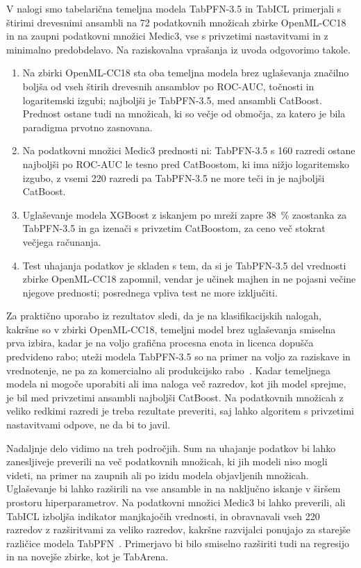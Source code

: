 \documentclass[a4paper,12pt,openright]{book}
\begin{document}
V nalogi smo tabelarična temeljna modela TabPFN-3.5 in TabICL primerjali s
štirimi drevesnimi ansambli na 72 podatkovnih množicah zbirke OpenML-CC18 in na
zaupni podatkovni množici Medic3, vse s privzetimi nastavitvami in z minimalno
predobdelavo. Na raziskovalna vprašanja iz uvoda odgovorimo takole.
\begin{enumerate}
\item Na zbirki OpenML-CC18 sta oba temeljna modela brez uglaševanja značilno
boljša od vseh štirih drevesnih ansamblov po ROC-AUC, točnosti in logaritemski
izgubi; najboljši je TabPFN-3.5, med ansambli CatBoost. Prednost ostane tudi na
množicah, ki so večje od območja, za katero je bila paradigma prvotno
zasnovana.
\item Na podatkovni množici Medic3 prednosti ni: TabPFN-3.5 s 160 razredi ostane
najboljši po ROC-AUC le tesno pred CatBoostom, ki ima nižjo logaritemsko
izgubo, z vsemi 220 razredi pa TabPFN-3.5 ne more teči in je najboljši CatBoost.
\item Uglaševanje modela XGBoost z iskanjem po mreži zapre \SI{38}{\percent}
zaostanka za TabPFN-3.5 in ga izenači s privzetim CatBoostom, za ceno več
stokrat večjega računanja.
\item Test uhajanja podatkov je skladen s tem, da si je TabPFN-3.5 del
vrednosti zbirke OpenML-CC18 zapomnil, vendar je učinek majhen in ne pojasni
večine njegove prednosti; posrednega vpliva test ne more izključiti.
\end{enumerate}

Za praktično uporabo iz rezultatov sledi, da je na klasifikacijskih nalogah,
kakršne so v zbirki OpenML-CC18, temeljni model brez uglaševanja smiselna prva
izbira, kadar je na voljo grafična procesna enota in licenca dopušča
predvideno rabo; uteži modela TabPFN-3.5 so na primer na voljo za raziskave in
vrednotenje, ne pa za komercialno ali produkcijsko
rabo~\cite{jager2026tabpfn35}. Kadar temeljnega modela ni mogoče uporabiti ali
ima naloga več razredov, kot jih model sprejme, je bil med privzetimi ansambli
najboljši CatBoost. Na podatkovnih množicah z veliko redkimi razredi je treba
rezultate preveriti, saj lahko algoritem s privzetimi nastavitvami odpove, ne
da bi to javil.

Nadaljnje delo vidimo na treh področjih. Sum na uhajanje podatkov bi lahko
zanesljiveje preverili na več podatkovnih množicah, ki jih modeli niso mogli
videti, na primer na zaupnih ali po izidu modela objavljenih množicah.
Uglaševanje bi lahko razširili na vse ansamble in na naključno iskanje v širšem
prostoru hiperparametrov. Na podatkovni množici Medic3 bi lahko preverili, ali
TabICL izboljša indikator manjkajočih vrednosti, in obravnavali vseh 220
razredov z razširitvami za veliko razredov, kakršne razvijalci ponujajo za
starejše različice modela TabPFN~\cite{grinsztajn2026tabpfn3}. Primerjavo bi
bilo smiselno razširiti tudi na regresijo in na novejše zbirke, kot je
TabArena.
\end{document}
